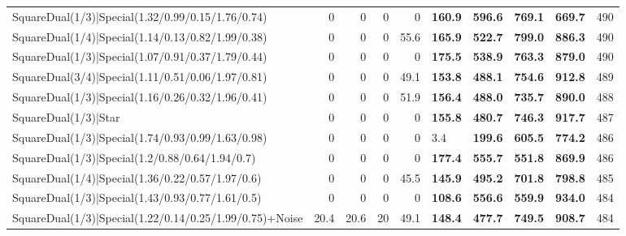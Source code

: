 \begin{tabular}{lrrrrllllr}
 SquareDual(1/3)|Special(1.32/0.99/0.15/1.76/0.74)       &          0   &          0   &          0   &             0   & \textbf{160.9} & \textbf{596.6} & \textbf{769.1} & \textbf{669.7}  &          490 \\
 SquareDual(1/4)|Special(1.14/0.13/0.82/1.99/0.38)       &          0   &          0   &          0   &            55.6 & \textbf{165.9} & \textbf{522.7} & \textbf{799.0} & \textbf{886.3}  &          490 \\
 SquareDual(1/3)|Special(1.07/0.91/0.37/1.79/0.44)       &          0   &          0   &          0   &             0   & \textbf{175.5} & \textbf{538.9} & \textbf{763.3} & \textbf{879.0}  &          490 \\
 SquareDual(3/4)|Special(1.11/0.51/0.06/1.97/0.81)       &          0   &          0   &          0   &            49.1 & \textbf{153.8} & \textbf{488.1} & \textbf{754.6} & \textbf{912.8}  &          489 \\
 SquareDual(1/3)|Special(1.16/0.26/0.32/1.96/0.41)       &          0   &          0   &          0   &            51.9 & \textbf{156.4} & \textbf{488.0} & \textbf{735.7} & \textbf{890.0}  &          488 \\
 SquareDual(1/3)|Star                                    &          0   &          0   &          0   &             0   & \textbf{155.8} & \textbf{480.7} & \textbf{746.3} & \textbf{917.7}  &          487 \\
 SquareDual(1/3)|Special(1.74/0.93/0.99/1.63/0.98)       &          0   &          0   &          0   &             0   & 3.4            & \textbf{199.6} & \textbf{605.5} & \textbf{774.2}  &          486 \\
 SquareDual(1/3)|Special(1.2/0.88/0.64/1.94/0.7)         &          0   &          0   &          0   &             0   & \textbf{177.4} & \textbf{555.7} & \textbf{551.8} & \textbf{869.9}  &          486 \\
 SquareDual(1/4)|Special(1.36/0.22/0.57/1.97/0.6)        &          0   &          0   &          0   &            45.5 & \textbf{145.9} & \textbf{495.2} & \textbf{701.8} & \textbf{798.8}  &          485 \\
 SquareDual(1/3)|Special(1.43/0.93/0.77/1.61/0.5)        &          0   &          0   &          0   &             0   & \textbf{108.6} & \textbf{556.6} & \textbf{559.9} & \textbf{934.0}  &          484 \\
 SquareDual(1/3)|Special(1.22/0.14/0.25/1.99/0.75)+Noise &         20.4 &         20.6 &         20   &            49.1 & \textbf{148.4} & \textbf{477.7} & \textbf{749.5} & \textbf{908.7}  &          484 \\

\end{tabular}
